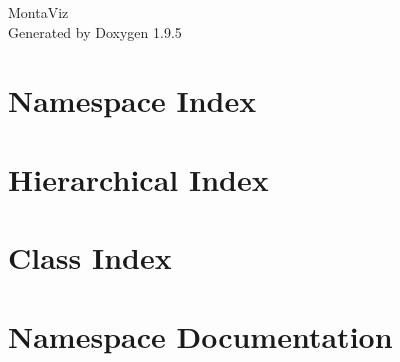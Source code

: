 \documentclass[twoside]{book}
\newcommand{\+}{\discretionary{\mbox{\scriptsize$\hookleftarrow$}}{}{}}
\newcommand{\clearemptydoublepage}{%
    \newpage{\pagestyle{empty}\cleardoublepage}%
  }
\begin{document}
  \raggedbottom
    \hypersetup{pageanchor=false,
                bookmarksnumbered=true,
                pdfencoding=unicode
               }
  \begin{titlepage}
  \vspace*{7cm}
  \begin{center}%
  {\Large Monta\+Viz}\\
  \vspace*{1cm}
  {\large Generated by Doxygen 1.9.5}\\
  \end{center}
  \end{titlepage}
  \clearemptydoublepage
  \tableofcontents
  \clearemptydoublepage
  \hypersetup{pageanchor=true}
\chapter{Namespace Index}

\chapter{Hierarchical Index}

\chapter{Class Index}

\chapter{Namespace Documentation}























\end{document}
